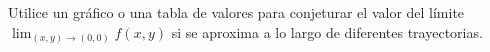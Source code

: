 \item Utilice un gráfico o una tabla de valores para conjeturar el valor del límite $\lim_{(x,y) \to (0,0)} f(x,y)$ si se aproxima a lo largo de diferentes trayectorias.
